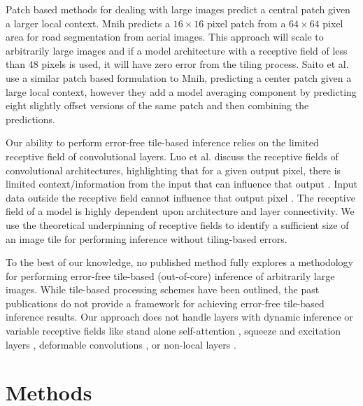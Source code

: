 \documentclass[10pt, indentfirst]{article}
\begin{document}
Patch based methods for dealing with large images predict a central patch given a larger local context.
Mnih \citep{Mnih2013} predicts a $16 \times 16$ pixel patch from a $64 \times 64$ pixel area for road segmentation from aerial images.
This approach will scale to arbitrarily large images and if a model architecture with a receptive field of less than $48$ pixels is used, it will have zero error from the tiling process.
Saito et al. \citep{Saito2016} use a similar patch based formulation to Mnih, predicting a center patch given a large local context, however they add a model averaging component by predicting eight slightly offset versions of the same patch and then combining the predictions.

Our ability to perform error-free tile-based inference relies on the limited receptive field of convolutional layers.
Luo et al. \citep{Luo2016} discuss the receptive fields of convolutional architectures, highlighting that for a given output pixel, there is limited context/information from the input that can influence that output \citep{araujo2019computing}.
Input data outside the receptive field cannot influence that output pixel \citep{Luo2016}.
The receptive field of a model is highly dependent upon architecture and layer connectivity.
We use the theoretical underpinning of receptive fields to identify a sufficient size of an image tile for performing inference without tiling-based errors.

To the best of our knowledge, no published method fully explores a methodology for performing error-free tile-based (out-of-core) inference of arbitrarily large images.
While tile-based processing schemes have been outlined, the past publications do not provide a framework for achieving error-free tile-based inference results.
Our approach does not handle layers with dynamic inference or variable receptive fields like stand alone self-attention \citep{Ramachandran2019b}, squeeze and excitation layers \citep{Hu2018}, deformable convolutions \citep{Dai2017}, or non-local layers \citep{Wang2018c}.


\section{Methods}
\label{methods}
\end{document}
